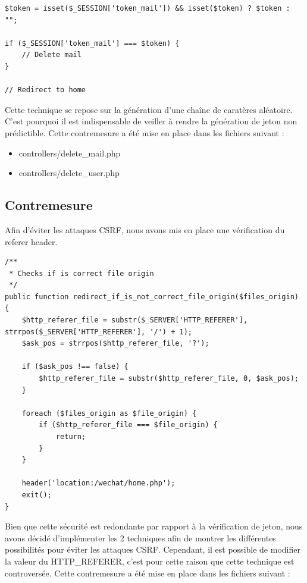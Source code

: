 \documentclass[12pt]{article}
\begin{document}
\begin{lstlisting}[style=JAVA]
$token = isset($_SESSION['token_mail']) && isset($token) ? $token : "";

if ($_SESSION['token_mail'] === $token) {
    // Delete mail
}

// Redirect to home
\end{lstlisting}

Cette technique se repose sur la génération d'une chaîne de caratères aléatoire. C'est pourquoi il est indispensable de veiller à rendre la génération de jeton non prédictible.
Cette contremesure a été mise en place dans les fichiers suivant :

\begin{itemize}
\item controllers/delete\_mail.php
\item controllers/delete\_user.php
\end{itemize}

\subsection{Contremesure}\label{c4}

Afin d'éviter les attaques CSRF, nous avons mis en place une vérification du referer header. 

\begin{lstlisting}[style=JAVA]
/**
 * Checks if is correct file origin
 */
public function redirect_if_is_not_correct_file_origin($files_origin) {
    $http_referer_file = substr($_SERVER['HTTP_REFERER'], strrpos($_SERVER['HTTP_REFERER'], '/') + 1);
    $ask_pos = strrpos($http_referer_file, '?');

    if ($ask_pos !== false) {
        $http_referer_file = substr($http_referer_file, 0, $ask_pos);
    }
    
    foreach ($files_origin as $file_origin) {
        if ($http_referer_file === $file_origin) {
            return;
        }
    }

    header('location:/wechat/home.php');
    exit();
}
\end{lstlisting}

Bien que cette sécurité est redondante par rapport à la vérification de jeton, nous avons décidé d'implémenter les 2 techniques afin de montrer les différentes possibilités pour éviter les attaques CSRF. Cependant, il est possible de modifier la valeur du HTTP\_REFERER, c'est pour cette raison que cette technique est controversée.
Cette contremesure a été mise en place dans les fichiers suivant :
\end{document}
